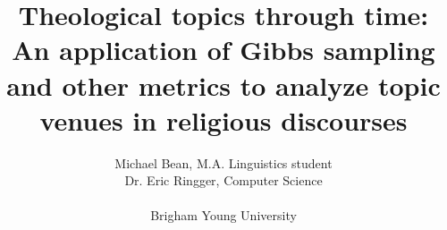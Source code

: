 \title{Theological topics through time:\\
An application of Gibbs sampling and other metrics to analyze topic venues in religious discourses}

\author{Michael Bean, M.A. Linguistics student\\
Dr. Eric Ringger, Computer Science
\\
\\
Brigham Young University
}
\maketitle
